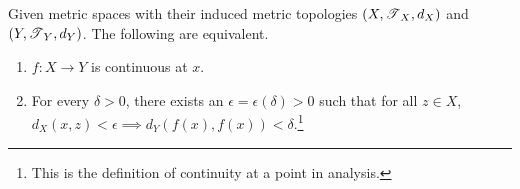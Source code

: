   \begin{theorem}[Analytic Continuity = Topological Continuity]
    \label{thm:analytic-continuity-topological-continuity}
 
    Given metric spaces with their induced metric topologies $(X, \operatorname{\mathscr{T}}_X, d_X)$ and $(Y, \operatorname{\mathscr{T}}_Y, d_Y)$. The following are equivalent. 
    \begin{enumerate}
      \item $f: X \rightarrow Y$ is continuous at $x$. 
      \item For every $\delta > 0$, there exists an $\epsilon = \epsilon(\delta) > 0$ such that for all $z \in X$, $d_X (x, z) < \epsilon \implies d_Y (f(x), f(x)) < \delta$.\footnote{This is the definition of continuity at a point in analysis.} 
    \end{enumerate}
  \end{theorem}
